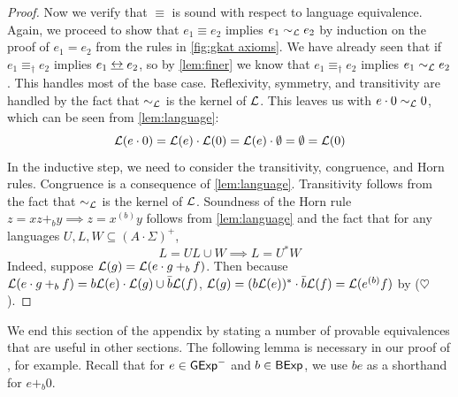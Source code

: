 \documentclass[orivec,envcountsect,envcountsame]{llncs}
\begin{document}
\begin{proof}
	Now we verify that \(\equiv\) is sound with respect to language equivalence.
	Again, we proceed to show that \(e_1 \equiv e_2\) implies \(e_1 \sim_{\mathcal{L}} e_2\) by induction on the proof of \(e_1 = e_2\) from the rules in \cref{fig:gkat axioms}.
	We have already seen that if \(e_1 \equiv_\dagger e_2\) implies \(e_1 \bisim e_2\), so by \cref{lem:finer} we know that \(e_1 \equiv_\dagger e_2\) implies \(e_1 \sim_{\mathcal{L}} e_2\).
	This handles most of the base case.
	Reflexivity, symmetry, and transitivity are handled by the fact that \(\sim_{\mathcal{L}}\) is the kernel of \(\mathcal{L}\).
	This leaves us with \(e\cdot 0 \sim_{\mathcal{L}} 0\), which can be seen from \cref{lem:language}:
	\[
	\mathcal{L}(e\cdot 0) = \mathcal{L}(e) \cdot \mathcal{L}(0) = \mathcal{L}(e) \cdot \emptyset = \emptyset = \mathcal{L}(0)
	\]
	In the inductive step, we need to consider the transitivity, congruence, and Horn rules.
	Congruence is a consequence of \cref{lem:language}.
	Transitivity follows from the fact that \(\sim_{\mathcal{L}}\) is the kernel of \(\mathcal{L}\).
	Soundness of the Horn rule \(z = xz +_b y \implies z = x^{(b)}y\) follows from \cref{lem:language} and the fact that for any languages \(U, L, W \subseteq (A \cdot \Sigma)^+\),
	\[
	L = UL \cup W \implies L = U^*W  \tag{\(\heartsuit\)}
	\]
	Indeed, suppose \(\mathcal{L}(g) = {\mathcal{L}(e\cdot g +_b f)}\).
	Then because \(\mathcal{L}(e\cdot g +_b f) = b\mathcal{L}(e)\cdot \mathcal{L}(g) \cup \bar b\mathcal{L}(f)\), \(\mathcal{L}(g) = (b\mathcal{L}(e))^*\cdot \bar b\mathcal{L}(f) = \mathcal{L}(e^{(b)} f)\) by (\(\heartsuit\)).
\end{proof}

We end this section of the appendix by stating a number of provable equivalences that are useful in other sections.
The following lemma is necessary in our proof of , for example.
Recall that for $e \in \mathsf{GExp}^-$ and $b \in \mathsf{BExp}$, we use $be$ as a shorthand for $e +_b 0$.
\end{document}
